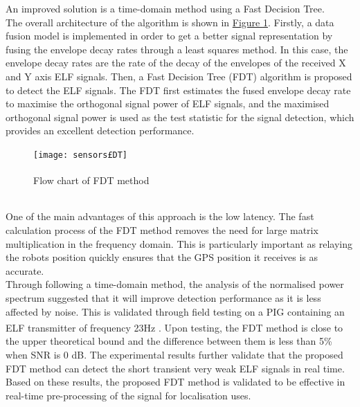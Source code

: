 \documentclass[11pt]{article}		%
\newcommand{\supercite}[1]{\textsuperscript{\cite{#1}}}		%
\newcommand{\figref}[1]{\hyperref[#1]{Figure \ref*{#1}}}    %
\begin{document}
		    \begin{floatingfigure}[r]{0pt} \end{floatingfigure}
			An improved solution is a time-domain method using a Fast Decision Tree. 
			\\
	    	\hspace*{3ex}The overall architecture of the algorithm is shown in \figref{FDTFlowchart}. 
	    	Firstly, a data fusion model is implemented in order to get a better signal representation by fusing the envelope decay rates through a least squares method. 
	    	In this case, the envelope decay rates are the rate of the decay of the envelopes of the received X and Y axis ELF signals. 
	    	Then, a Fast Decision Tree (FDT) algorithm is proposed to detect the ELF signals. 
	    	The FDT first estimates the fused envelope decay rate to maximise the orthogonal signal power of ELF signals, and the maximised orthogonal signal power is used as the test statistic for the signal detection, which provides an excellent detection performance.
	         \begin{figure}[h]
				\centering
				\texttt{[image: sensors£DT]}
				\caption{Flow chart of FDT method \supercite{FDT}}
				\label{FDTFlowchart}
			\end{figure}
			\\
            \hspace*{3ex}One of the main advantages of this approach is the low latency. 
			The fast calculation process of the FDT method removes the need for large matrix multiplication in the frequency domain. 
			This is particularly important as relaying the robots position quickly ensures that the GPS position it receives is as accurate. 
			\\
	    	\hspace*{3ex}Through following a time-domain method, the analysis of the normalised power spectrum suggested that it will improve detection performance as it is less affected by noise. 
	    	This is validated through field testing on a PIG containing an ELF transmitter of frequency 23Hz \supercite{FDT}. 
	    	Upon testing, the FDT method is close to the upper theoretical bound and the difference between them is less than 5\% when SNR is 0 dB.
	    	The experimental results further validate that the proposed FDT method can detect the short transient very weak ELF signals in real time. 
	    	Based on these results, the proposed FDT method is validated to be effective in real-time pre-processing of the signal for localisation uses.
			
\end{document}
